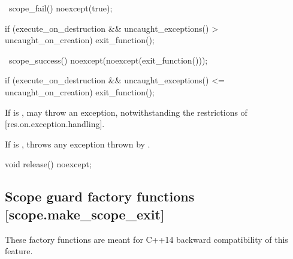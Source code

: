 \documentclass[ebook,11pt,article]{memoir}
\begin{document}
\begin{itemdecl}
~scope_fail() noexcept(true);
\end{itemdecl}

\begin{itemdescr}
\pnum
\effects 
\begin{codeblock}
if (execute_on_destruction
   && uncaught_exceptions() > uncaught_on_creation)
	exit_function();
\end{codeblock}
\end{itemdescr}

\begin{itemdecl}
~scope_success() noexcept(noexcept(exit_function()));
\end{itemdecl}

\begin{itemdescr}
\pnum
\effects
\begin{codeblock}
if (execute_on_destruction 
   && uncaught_exceptions() <= uncaught_on_creation)
	exit_function();   
\end{codeblock}

\pnum
\remarks
If  is ,  may throw an exception, notwithstanding the restrictions of [res.on.exception.handling].

\pnum
\throws
If  is , throws any exception thrown by .

\end{itemdescr}

\begin{itemdecl}
void release() noexcept;
\end{itemdecl}

\begin{itemdescr}
\pnum
\end{itemdescr}

\newpage

\subsection {Scope guard factory functions [scope.make_scope_exit]}
\begin{note}
These factory functions are meant for C++14 backward compatibility of this feature. 
\end{note}
\end{document}
